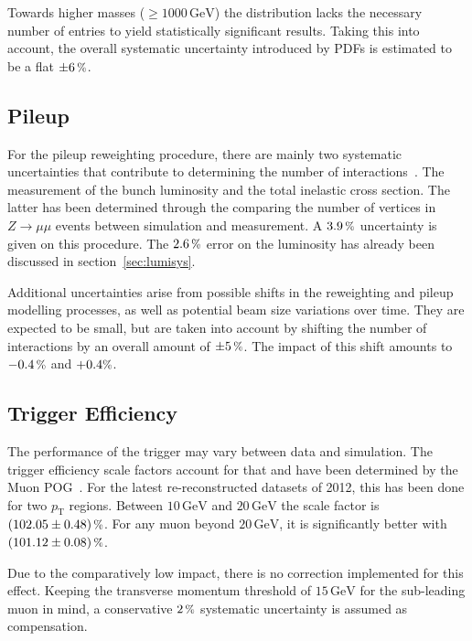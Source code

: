 Towards higher masses ($\geq 1000\,\text{GeV}$) the distribution lacks the necessary number of entries to yield statistically significant results. Taking this into account, the overall systematic uncertainty introduced by PDFs is estimated to be a flat $\pm 6\,\pct$.


\subsection{Pileup}
\label{sec:pusys}

For the pileup reweighting procedure, there are mainly two systematic uncertainties that contribute to determining the number of interactions~\cite{pileupsys}. The measurement of the bunch luminosity and the total inelastic cross section. The latter has been determined through the comparing the number of vertices in $Z \rightarrow \mu\mu$ events between simulation and measurement. A $3.9\,\pct$ uncertainty is given on this procedure. The $2.6\,\pct$ error on the luminosity has already been discussed in section~\ref{sec:lumisys}.

Additional uncertainties arise from possible shifts in the reweighting and pileup modelling processes, as well as potential beam size variations over time. They are expected to be small, but are taken into account by shifting the number of interactions by an overall amount of $\pm 5\,\pct$. The impact of this shift amounts to $-0.4\,\pct$ and $+0.4\pct$.


\subsection{Trigger Efficiency}
\label{sec:trig-eff}

The performance of the trigger may vary between data and simulation. The trigger efficiency scale factors account for that and have been determined by the Muon POG~\cite{trigeff}. For the latest re-reconstructed datasets of 2012, this has been done for two $p_{\text{T}}$ regions. Between $10\,\text{GeV}$ and $20\,\text{GeV}$ the scale factor is $(102.05 \pm 0.48) \,\pct$. For any muon beyond $20\,\text{GeV}$, it is significantly better with $(101.12 \pm 0.08) \,\pct$.

Due to the comparatively low impact, there is no correction implemented for this effect. Keeping the transverse momentum threshold of $15\,\text{GeV}$ for the sub-leading muon in mind, a conservative $2\,\pct$ systematic uncertainty is assumed as compensation. 




